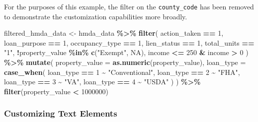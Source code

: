 \documentclass[
]{book}
\newenvironment{Shaded}{\begin{snugshade}}{\end{snugshade}}
\newcommand{\AttributeTok}[1]{\textcolor[rgb]{0.13,0.29,0.53}{#1}}
\newcommand{\ConstantTok}[1]{\textcolor[rgb]{0.56,0.35,0.01}{#1}}
\newcommand{\DecValTok}[1]{\textcolor[rgb]{0.00,0.00,0.81}{#1}}
\newcommand{\FunctionTok}[1]{\textcolor[rgb]{0.13,0.29,0.53}{\textbf{#1}}}
\newcommand{\NormalTok}[1]{#1}
\newcommand{\OtherTok}[1]{\textcolor[rgb]{0.56,0.35,0.01}{#1}}
\newcommand{\SpecialCharTok}[1]{\textcolor[rgb]{0.81,0.36,0.00}{\textbf{#1}}}
\newcommand{\StringTok}[1]{\textcolor[rgb]{0.31,0.60,0.02}{#1}}
\begin{document}
For the purposes of this example, the filter on the \texttt{county\_code} has been removed to demonstrate the customization capabilities more broadly.

\begin{Shaded}
\begin{Highlighting}[]
\NormalTok{filtered\_hmda\_data }\OtherTok{\textless{}{-}}\NormalTok{ hmda\_data }\SpecialCharTok{\%\textgreater{}\%}
  \FunctionTok{filter}\NormalTok{(}
\NormalTok{    action\_taken }\SpecialCharTok{==} \DecValTok{1}\NormalTok{,}
\NormalTok{    loan\_purpose }\SpecialCharTok{==} \DecValTok{1}\NormalTok{,}
\NormalTok{    occupancy\_type }\SpecialCharTok{==} \DecValTok{1}\NormalTok{,}
\NormalTok{    lien\_status }\SpecialCharTok{==} \DecValTok{1}\NormalTok{,}
\NormalTok{    total\_units }\SpecialCharTok{==} \StringTok{"1"}\NormalTok{,}
    \SpecialCharTok{!}\NormalTok{property\_value }\SpecialCharTok{\%in\%} \FunctionTok{c}\NormalTok{(}\StringTok{"Exempt"}\NormalTok{, }\ConstantTok{NA}\NormalTok{),}
\NormalTok{    income }\SpecialCharTok{\textless{}=} \DecValTok{250} \SpecialCharTok{\&}\NormalTok{ income }\SpecialCharTok{\textgreater{}} \DecValTok{0}
\NormalTok{  ) }\SpecialCharTok{\%\textgreater{}\%}
  \FunctionTok{mutate}\NormalTok{(}
    \AttributeTok{property\_value =} \FunctionTok{as.numeric}\NormalTok{(property\_value),}
    \AttributeTok{loan\_type =} \FunctionTok{case\_when}\NormalTok{(}
\NormalTok{      loan\_type }\SpecialCharTok{==} \DecValTok{1} \SpecialCharTok{\textasciitilde{}} \StringTok{"Conventional"}\NormalTok{,}
\NormalTok{      loan\_type }\SpecialCharTok{==} \DecValTok{2} \SpecialCharTok{\textasciitilde{}} \StringTok{"FHA"}\NormalTok{,}
\NormalTok{      loan\_type }\SpecialCharTok{==} \DecValTok{3} \SpecialCharTok{\textasciitilde{}} \StringTok{"VA"}\NormalTok{,}
\NormalTok{      loan\_type }\SpecialCharTok{==} \DecValTok{4} \SpecialCharTok{\textasciitilde{}} \StringTok{"USDA"}
\NormalTok{    )}
\NormalTok{  ) }\SpecialCharTok{\%\textgreater{}\%}
  \FunctionTok{filter}\NormalTok{(property\_value }\SpecialCharTok{\textless{}} \DecValTok{1000000}\NormalTok{)}
\end{Highlighting}
\end{Shaded}

\hypertarget{customizing-text-elements}{%
\subsubsection*{Customizing Text Elements}\label{customizing-text-elements}}
\end{document}
